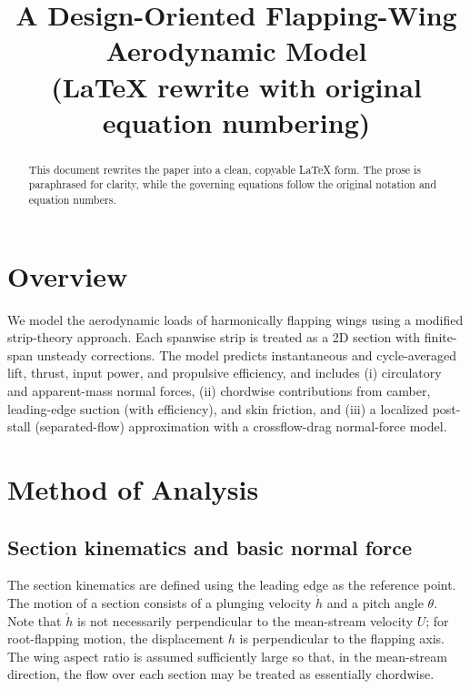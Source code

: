 \documentclass[11pt,a4paper]{article}
\title{A Design-Oriented Flapping-Wing Aerodynamic Model\\(LaTeX rewrite with original equation numbering)}
\author{}
\date{}
\begin{document}
\maketitle

\begin{abstract}
This document rewrites the paper into a clean, copyable \LaTeX{} form. The prose is paraphrased for clarity, while the governing equations follow the original notation and equation numbers.
\end{abstract}

\tableofcontents

\section{Overview}
We model the aerodynamic loads of harmonically flapping wings using a modified strip-theory approach.
Each spanwise strip is treated as a 2D section with finite-span unsteady corrections. The model predicts
instantaneous and cycle-averaged lift, thrust, input power, and propulsive efficiency, and includes
(i) circulatory and apparent-mass normal forces, (ii) chordwise contributions from camber, leading-edge suction
(with efficiency), and skin friction, and (iii) a localized post-stall (separated-flow) approximation with a
crossflow-drag normal-force model.

\section{Method of Analysis}

\subsection{Section kinematics and basic normal force}
The section kinematics are defined using the leading edge as the reference point.
The motion of a section consists of a plunging velocity $\dot{h}$ and a pitch angle $\theta$.
Note that $\dot{h}$ is not necessarily perpendicular to the mean-stream velocity $U$; for root-flapping motion,
the displacement $h$ is perpendicular to the flapping axis. The wing aspect ratio is assumed sufficiently large
so that, in the mean-stream direction, the flow over each section may be treated as essentially chordwise.
\end{document}
